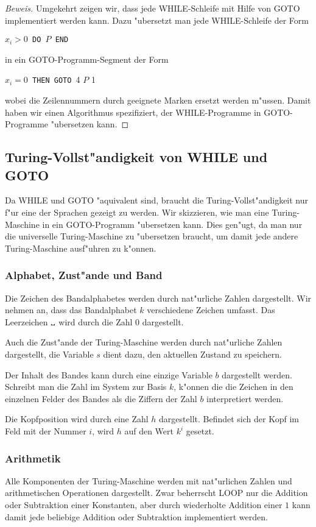 \begin{proof}[Beweis]
Umgekehrt zeigen wir, dass jede WHILE-Schleife mit Hilfe von GOTO
implementiert werden kann. Dazu "ubersetzt man jede WHILE-Schleife
der Form
\begin{algorithmic}
$x_i>0${\tt\ DO }$P${\tt\ END}
\end{algorithmic}
in ein GOTO-Programm-Segment der Form
\begin{algorithmic}[1]
$x_i=0${\tt\ THEN GOTO }4
\STATE$P$
1
\STATE
\end{algorithmic}
wobei die Zeilennummern durch geeignete Marken ersetzt werden m"ussen.
Damit haben wir einen Algorithmus spezifiziert, der WHILE-Programme in
GOTO-Programme "ubersetzen kann.
\end{proof}

\subsection{Turing-Vollst"andigkeit von WHILE und GOTO}
Da WHILE und GOTO "aquivalent sind, braucht die Turing-Vollst"andigkeit
nur f"ur eine der Sprachen gezeigt zu werden.
Wir skizzieren, wie man eine Turing-Maschine in ein GOTO-Programm
"ubersetzen kann. Dies gen"ugt, da man nur die universelle
Turing-Maschine zu "ubersetzen braucht, um damit jede andere
Turing-Maschine ausf"uhren zu k"onnen.

\subsubsection{Alphabet, Zust"ande und Band}
Die Zeichen des Bandalphabetes werden durch nat"urliche Zahlen
dargestellt.  Wir nehmen an, dass das Bandalphabet $k$ verschiedene Zeichen
umfasst. Das Leerzeichen $\text{\textvisiblespace}$ wird durch die Zahl $0$
dargestellt.

Auch die Zust"ande der Turing-Maschine werden durch nat"urliche Zahlen
dargestellt,
die Variable $s$ dient dazu, den aktuellen Zustand zu
speichern.

Der Inhalt des Bandes kann durch eine einzige Variable $b$ dargestellt
werden. Schreibt man die Zahl im System zur Basis $k$, k"onnen die
die Zeichen in den einzelnen Felder des Bandes als die Ziffern
der Zahl $b$ interpretiert werden.

Die Kopfposition wird durch eine Zahl $h$ dargestellt. Befindet sich
der Kopf im Feld mit der Nummer $i$, wird $h$ auf den Wert $k^i$
gesetzt.

\subsubsection{Arithmetik}
Alle Komponenten der Turing-Maschine werden mit nat"urlichen Zahlen
und arithmetischen Operationen dargestellt.
Zwar beherrscht LOOP nur die Addition oder Subtraktion einer Konstanten,
aber durch wiederholte Addition einer $1$ kann damit jede beliebige
Addition oder Subtraktion implementiert werden.

